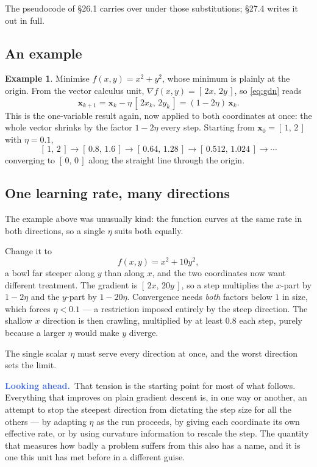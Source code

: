 \documentclass[11pt]{article}
\theoremstyle{plain}
\theoremstyle{definition}
\newtheorem{ex}{Example}[section]
\theoremstyle{remark}
\newcommand{\lookahead}{\par\smallskip\noindent
  \textbf{\sffamily\textcolor{RoyalBlue}{Looking ahead.}}\ \ignorespaces}
\newcommand{\vc}[1]{\mathbf{#1}}
\newcommand{\grad}{\nabla}
\newcommand{\lr}{\eta}
\begin{document}
The pseudocode of \S26.1 carries over under those substitutions; \S27.4 writes
it out in full.

\subsection{An example}
\begin{ex}
Minimise $f(x,y)=x^{2}+y^{2}$, whose minimum is plainly at the origin. From the
vector calculus unit, $\grad f(x,y)=[\,2x,\,2y\,]$, so \eqref{eq:gdn} reads
\[
  \vc{x}_{k+1}
  = \vc{x}_k - \lr\,[\,2x_k,\,2y_k\,]
  = (1-2\lr)\,\vc{x}_k .
\]
This is the one-variable result again, now applied to both coordinates at once:
the whole vector shrinks by the factor $1-2\lr$ every step. Starting from
$\vc{x}_0=[\,1,\,2\,]$ with $\lr=0.1$,
\[
  [\,1,\,2\,] \to [\,0.8,\,1.6\,] \to [\,0.64,\,1.28\,]
  \to [\,0.512,\,1.024\,] \to \cdots
\]
converging to $[\,0,\,0\,]$ along the straight line through the origin.
\end{ex}

\subsection{One learning rate, many directions}
The example above was unusually kind: the function curves at the same rate in
both directions, so a single $\lr$ suits both equally.

Change it to
\[
  f(x,y) = x^{2} + 10y^{2} ,
\]
a bowl far steeper along $y$ than along $x$, and the two coordinates now want
different treatment. The gradient is $[\,2x,\,20y\,]$, so a step multiplies the
$x$-part by $1-2\lr$ and the $y$-part by $1-20\lr$. Convergence needs
\emph{both} factors below $1$ in size, which forces $\lr<0.1$ --- a restriction
imposed entirely by the steep direction. The shallow $x$ direction is then
crawling, multiplied by at least $0.8$ each step, purely because a larger $\lr$
would make $y$ diverge.

The single scalar $\lr$ must serve every direction at once, and the worst
direction sets the limit.

\lookahead That tension is the starting point for most of what follows.
Everything that improves on plain gradient descent is, in one way or another, an
attempt to stop the steepest direction from dictating the step size for all the
others --- by adapting $\lr$ as the run proceeds, by giving each coordinate its
own effective rate, or by using curvature information to rescale the step. The
quantity that measures how badly a problem suffers from this also has a name,
and it is one this unit has met before in a different guise.
\end{document}
